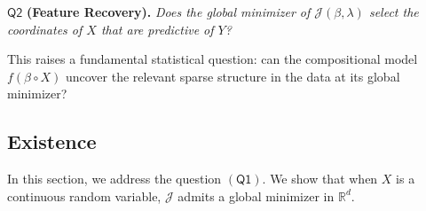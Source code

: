 \documentclass[sn-mathphys-num]{sn-jnl}%
\numberwithin{equation}{section}
\newcommand{\R}{\mathbb{R}}
\theoremstyle{thmstyleone}%
\theoremstyle{thmstyletwo}%
\theoremstyle{thmstylethree}%
\begin{document}
\vspace{1em}
\noindent
$\mathsf{Q2}$ \textbf{(Feature Recovery).}
\textit{Does the global minimizer of $\mathcal{J}(\beta, \lambda)$ select the coordinates of $X$ that are predictive of $Y$?}

This raises a fundamental statistical question: can the compositional model $f(\beta \circ X)$ uncover the relevant sparse structure in the data at its global minimizer? 

\subsection{Existence} 
In this section, we address the question $(\mathsf{Q1})$. We show that when $X$ is a continuous random variable, $\mathcal{J}$ admits a global minimizer in $\R^d$. 
\end{document}
